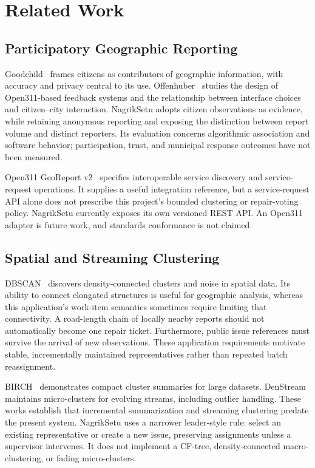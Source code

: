 \documentclass[conference,a4paper]{IEEEtran}
\begin{document}
\section{Related Work}
\subsection{Participatory Geographic Reporting}
Goodchild~\cite{goodchild2007} frames citizens as contributors of geographic information, with accuracy and privacy central to its use. Offenhuber~\cite{offenhuber2015} studies the design of Open311-based feedback systems and the relationship between interface choices and citizen--city interaction. NagrikSetu adopts citizen observations as evidence, while retaining anonymous reporting and exposing the distinction between report volume and distinct reporters. Its evaluation concerns algorithmic association and software behavior; participation, trust, and municipal response outcomes have not been measured.

Open311 GeoReport v2~\cite{open311} specifies interoperable service discovery and service-request operations. It supplies a useful integration reference, but a service-request API alone does not prescribe this project's bounded clustering or repair-voting policy. NagrikSetu currently exposes its own versioned REST API. An Open311 adapter is future work, and standards conformance is not claimed.

\subsection{Spatial and Streaming Clustering}
DBSCAN~\cite{ester1996} discovers density-connected clusters and noise in spatial data. Its ability to connect elongated structures is useful for geographic analysis, whereas this application's work-item semantics sometimes require limiting that connectivity. A road-length chain of locally nearby reports should not automatically become one repair ticket. Furthermore, public issue references must survive the arrival of new observations. These application requirements motivate stable, incrementally maintained representatives rather than repeated batch reassignment.

BIRCH~\cite{zhang1996} demonstrates compact cluster summaries for large datasets. DenStream~\cite{cao2006} maintains micro-clusters for evolving streams, including outlier handling. These works establish that incremental summarization and streaming clustering predate the present system. NagrikSetu uses a narrower leader-style rule: select an existing representative or create a new issue, preserving assignments unless a supervisor intervenes. It does not implement a CF-tree, density-connected macro-clustering, or fading micro-clusters.
\end{document}
